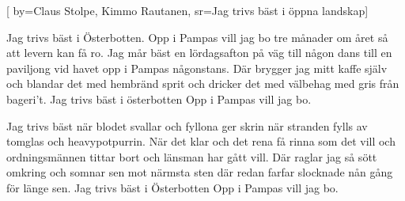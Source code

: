 
[
	by={Claus Stolpe, Kimmo Rautanen},
	sr={Jag trivs bäst i öppna landskap}]
  
\beginverse*
Jag trivs bäst i Österbotten.
Opp i Pampas vill jag bo
tre månader om året
så att levern kan få ro.
Jag mår bäst en lördagsafton
på väg till någon dans
till en paviljong vid havet
opp i Pampas någonstans.
Där brygger jag mitt kaffe själv
och blandar det med hembränd sprit
och dricker det med välbehag
med gris från bageri't. 
Jag trivs bäst i österbotten
Opp i Pampas vill jag bo. 
\endverse

\beginverse*
Jag trivs bäst när blodet svallar
och fyllona ger skrin
när stranden fylls av tomglas
och heavypotpurrin.
När det klar och det rena
få rinna som det vill
och ordningsmännen tittar bort
och länsman har gått vill. 
Där raglar jag så sött omkring
och somnar sen mot närmsta sten
där redan farfar slocknade
nån gång för länge sen.
Jag trivs bäst i Österbotten
Opp i Pampas vill jag bo.
\endverse

\endsong
